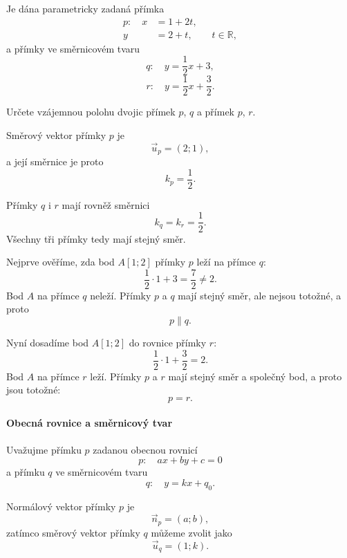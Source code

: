 \begin{example}\label{exa:Mixed_parametric_slope_parallel_coincident}
    Je dána parametricky zadaná přímka
    \[
        \begin{aligned}
            p:\quad x&=1+2t,\\
                     y&=2+t,
                     \qquad t\in\mathbb{R},
        \end{aligned}
    \]
    a přímky ve směrnicovém tvaru
    \[
        q:\quad y=\frac12x+3,
    \]
    \[
        r:\quad y=\frac12x+\frac32.
    \]

    Určete vzájemnou polohu dvojic přímek $p$, $q$ a přímek $p$, $r$.

    Směrový vektor přímky $p$ je
    \[
        \vec{u}_p=(2;1),
    \]
    a její směrnice je proto
    \[
        k_p=\frac12.
    \]

    Přímky $q$ i $r$ mají rovněž směrnici
    \[
        k_q=k_r=\frac12.
    \]
    Všechny tři přímky tedy mají stejný směr.

    Nejprve ověříme, zda bod $A[1;2]$ přímky $p$ leží na přímce $q$:
    \[
        \frac12\cdot1+3
        =
        \frac72
        \neq
        2.
    \]
    Bod $A$ na přímce $q$ neleží. Přímky $p$ a $q$ mají stejný směr,
    ale nejsou totožné, a proto
    \[
        p\parallel q.
    \]

    Nyní dosadíme bod $A[1;2]$ do rovnice přímky $r$:
    \[
        \frac12\cdot1+\frac32
        =
        2.
    \]
    Bod $A$ na přímce $r$ leží. Přímky $p$ a $r$ mají stejný směr
    a společný bod, a proto jsou totožné:
    \[
        p=r.
    \]
\end{example}


\paragraph{Obecná rovnice a směrnicový tvar}

Uvažujme přímku $p$ zadanou obecnou rovnicí
\begin{equation}\label{eq:Mixed_general_slope_p}
    p:\quad ax+by+c=0
\end{equation}
a přímku $q$ ve směrnicovém tvaru
\begin{equation}\label{eq:Mixed_general_slope_q}
    q:\quad y=kx+q_0.
\end{equation}

Normálový vektor přímky $p$ je
\[
    \vec{n}_p=(a;b),
\]
zatímco směrový vektor přímky $q$ můžeme zvolit jako
\[
    \vec{u}_q=(1;k).
\]

